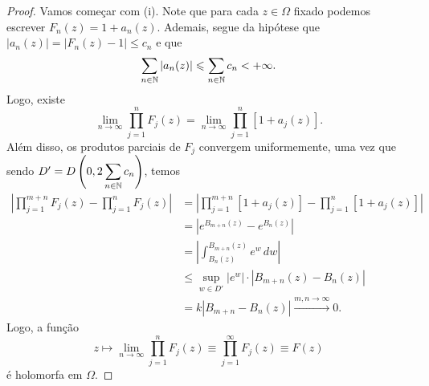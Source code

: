     \begin{proof}
       Vamos começar com (i). Note que para cada $z\in\Omega$ fixado podemos
       escrever $F_n(z) = 1 + a_n(z)$. Ademais, segue da hipótese que
       $|a_n(z)| = |F_n(z) - 1| \leq c_n$ e que
       \begin{equation*}
           \sum_{n\in\mathbb{N}} |a_n(z)| \leqslant \sum_{n\in\mathbb{N}} c_n < +\infty.
       \end{equation*}
       Logo, existe
       \begin{equation*}
           \lim_{n\to\infty} \prod_{j=1}^n F_j(z) 
           = \lim_{n\to\infty} \prod_{j=1}^n [1 + a_j(z)].
       \end{equation*}
       Além disso, os produtos parciais de $F_j$ convergem uniformemente, uma vez
       que sendo $D' = \displaystyle{ D\left( 0, 2\sum_{n\in\mathbb{N}} c_n \right) }$, temos
       \begin{align*}
           \left| \prod_{j=1}^{m+n} F_j(z) - \prod_{j=1}^{n} F_j(z) \right|
           &=\left|\prod_{j=1}^{m+n} [1+a_j(z)] - \prod_{j=1}^{n} [1+a_j(z)] \right| \\
           &= \left| e^{B_{m+n}(z)} - e^{B_n(z)} \right| \\
           &= \left| \int_{B_n(z)}^{B_{m+n}(z)} e^w \, dw \right| \\
           &\leq \sup_{w\in D'} 
           |e^w|\cdot |B_{m+n}(z) - B_n(z)| \\
           &= k|B_{m+n} - B_n(z)| \xrightarrow{m,n\to\infty} 0.
       \end{align*}
       Logo, a função
       \begin{equation*}
           z \mapsto \lim_{n\to\infty} \prod_{j=1}^n F_j(z) 
                                       \equiv \prod_{j=1}^{\infty} F_j(z)
                                       \equiv F(z)
       \end{equation*}
       é holomorfa em $\Omega$.
       

\end{proof}

